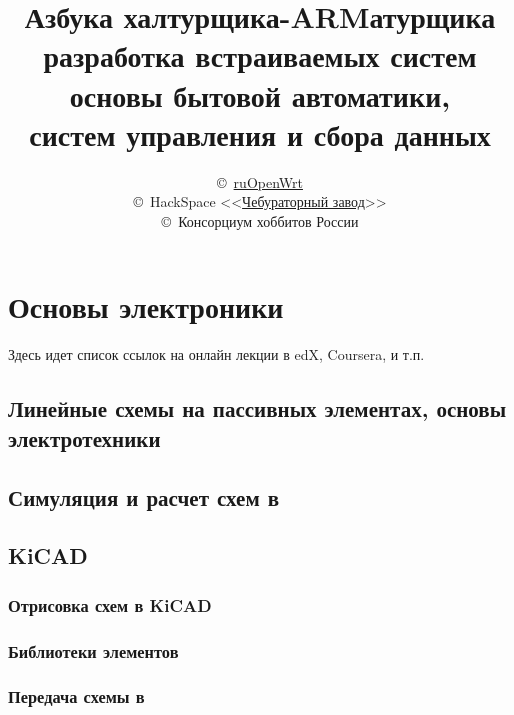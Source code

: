 

\author{\copyright\
\href{https://groups.google.com/forum/\#!forum/openwrt2ru}{ruOpenWrt}\\
\copyright\
HackSpace
<<\href{https://github.com/ponyatov/CHBZ/raw/master/presentation.pdf}{Чебураторный
завод}>>\\
\copyright\
Консорциум хоббитов России
}

\title{
\textbf{Азбука халтурщика-ARMатурщика}\\
разработка встраиваемых систем\\
основы бытовой автоматики,\\
систем управления и сбора данных
}


\maketitle
\tableofcontents\clearpage



\part{Основы электроники}

Здесь идет список ссылок на онлайн лекции в edX, Coursera, и т.п.

\chapter{Линейные схемы на пассивных элементах, основы электротехники}

\chapter{Симуляция и расчет схем в \spice}

\chapter{KiCAD} 

\section{Отрисовка схем в KiCAD}

\section{Библиотеки элементов}

\section{Передача схемы в \spice}

